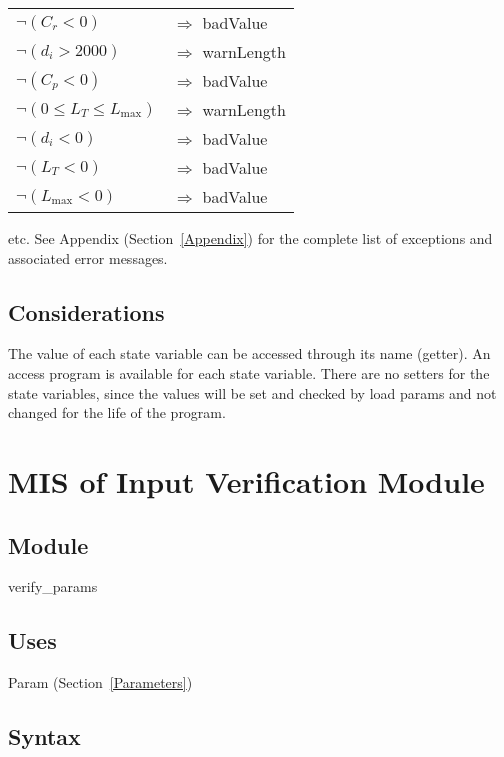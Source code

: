 \documentclass[12pt, titlepage]{article}
\begin{document}
\noindent \begin{longtable*}[l]{l l} 
$\neg (C_r < 0)$ & $\Rightarrow$ badValue\\
$\neg (d_i > 2000)$ & $\Rightarrow$ warnLength\\
$\neg (C_p < 0)$ & $\Rightarrow$ badValue\\
$\neg (0 \leq L_T \leq L_\text{max})$ & $\Rightarrow$ warnLength\\
$\neg (d_i < 0)$ & $\Rightarrow$ badValue\\
$\neg (L_T < 0)$ & $\Rightarrow$ badValue\\
$\neg (L_\text{max} < 0)$ & $\Rightarrow$ badValue\\
\end{longtable*}

etc.  See Appendix (Section~\ref{Appendix}) for the complete list of exceptions and
associated error messages.

\subsection{Considerations}

The value of each state variable can be accessed through its name (getter).  An
access program is available for each state variable.  There are no setters for
the state variables, since the values will be set and checked by load params and
not changed for the life of the program.

\newpage

 \section{MIS of Input Verification Module} \label{VerifyInput}

 \subsection{Module}

 verify\_params

 \subsection{Uses}

 Param (Section~\ref{Parameters})

 \subsection{Syntax}
\end{document}
